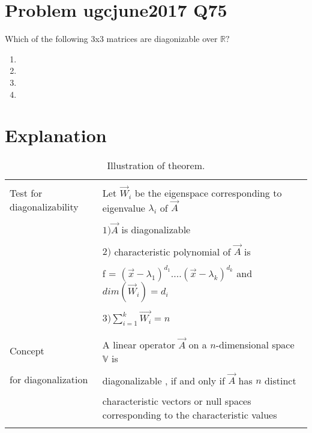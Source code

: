 \documentclass[journal,12pt]{IEEEtran}
\begin{document}
\renewcommand{\thefigure}{\theenumi}
\renewcommand{\thetable}{\theenumi}

\section{\textbf{Problem ugcjune2017 Q75}}
Which of the following 3x3 matrices are diagonizable over $\mathbb{R}?$\\
\begin{enumerate}
    \item {}
    \item {}
    \item {}
    \item {}
\end{enumerate}
\section{\textbf{Explanation}}
\renewcommand{\thetable}{1}
\begin{longtable}{|l|l|}
\hline
\multirow{3}{*}{Test for diagonalizability} & \\
& Let $\vec{W}_{i}$ be the eigenspace corresponding to eigenvalue $\lambda_{i}$  of $\vec{A}$\\
&\\
& $1)\vec{A}$ is diagonalizable \\
&\\
& $2)$ characteristic polynomial of $\vec{A}$ is \\
&\\
& f = $(\vec{x}-\lambda_1)^{d_1}....(\vec{x}-\lambda_k)^{d_k}$ and $dim(\vec{W}_i) = d_i $\\
&\\
& $3) \sum_{i=1}^{k}\vec{W_i}=n$\\
&\\
\hline
\multirow{3}{*}{Concept} & \\
&
A linear operator $\vec{A}$ on a $n$-dimensional space $\mathbb{V}$ is\\ 
&\\ for diagonalization
& diagonalizable , if and only if $\vec{A}$ has $n$ distinct \\
&\\
& characteristic vectors or null spaces corresponding to the characteristic values\\
\hline
\caption{Illustration of theorem.}
\label{table:1}
\end{longtable}
\newpage
\end{document}
